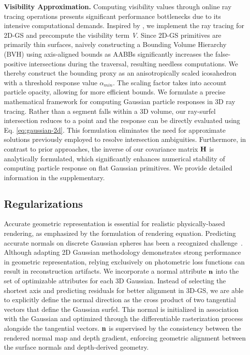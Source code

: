 \noindent\textbf{Visibility Approximation.}
Computing visibility values through online ray tracing operations presents significant performance bottlenecks due to its intensive computational demands. Inspired by \cite{gao2023relightable,moenne20243d}, we implement the ray tracing for 2D-GS and precompute the visibility term \textit{V}. Since 2D-GS primitives are primarily thin surfaces, naively constructing a Bounding Volume Hierarchy (BVH) using axis-aligned bounds as AABBs significantly increases the false-positive intersections during the traversal, resulting needless computations. We thereby construct the bounding proxy as an anisotropically scaled icosahedron~\cite{moenne20243d} with a threshold response value $\alpha_{min}$. The scaling factor takes into account particle opacity, allowing for more efficient bounds. We formulate a precise mathematical framework for computing Gaussian particle responses in 3D ray tracing. Rather than a segment falls within a 3D volume, our ray-surfel intersection reduces to a point and the response can be directly evaluated using Eq. \ref{eq:gaussian-2d}. This formulation eliminates the need for approximate solutions previously employed to resolve intersection ambiguities. Furthermore, in contrast to prior approaches, the inverse of our covariance matrix $\mathbf{H}$ is analytically formulated, which significantly enhances numerical stability of computing particle response on flat Gaussian primitives. We provide detailed information in the supplementary. 



\subsection{Regularizations}
\label{sec:regularization}

Accurate geometric representation is essential for realistic physically-based rendering, as emphasized by the formulation of rendering equation. Predicting accurate normals on discrete Gaussian spheres has been a recognized challenge~\cite{kerbl20233d,Huang2DGS2024,jiang2024gaussianshader,liang2024gs,gao2023relightable}. Although adapting 2D Gaussian methodology demonstrates strong performance in geometric representation, relying exclusively on photometric loss functions can result in reconstruction artifacts. We incorporate a normal attribute $\mathbf{n}$ into the set of optimizable attributes for each 3D Gaussian. Instead of selecting the shortest axis and predicting residuals for better alignment in 3D-GS, we are able to explicitly define the normal direction as the cross product of two tangential vectors that define the Gaussian surfel. This normal is initialized in association with the Gaussian and optimized through the differentiable rasterization process alongside the tangential vectors. $\mathbf{n}$ is supervised by the consistency between the rendered normal map and depth gradient, enforcing geometric alignment between the surface normals and depth-derived geometry.

